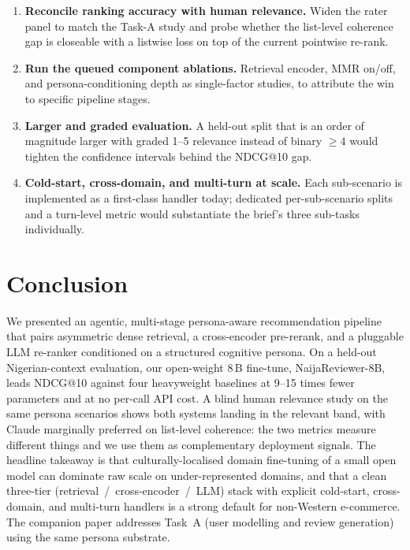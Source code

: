 \documentclass[sigconf,nonacm,balance]{acmart}
\begin{document}
\begin{enumerate}[leftmargin=*]
  \item \textbf{Reconcile ranking accuracy with human relevance.} Widen the
        rater panel to match the Task-A study and probe whether the
        list-level coherence gap is closeable with a listwise loss on top
        of the current pointwise re-rank.
  \item \textbf{Run the queued component ablations.} Retrieval encoder,
        MMR on/off, and persona-conditioning depth as single-factor studies,
        to attribute the win to specific pipeline stages.
  \item \textbf{Larger and graded evaluation.} A held-out split that is
        an order of magnitude larger with graded 1--5 relevance instead of
        binary $\geq 4$ would tighten the confidence intervals behind the
        NDCG@10 gap.
  \item \textbf{Cold-start, cross-domain, and multi-turn at scale.} Each
        sub-scenario is implemented as a first-class handler today;
        dedicated per-sub-scenario splits and a turn-level metric would
        substantiate the brief's three sub-tasks individually.
\end{enumerate}

\section{Conclusion}

We presented an agentic, multi-stage persona-aware recommendation pipeline
that pairs asymmetric dense retrieval, a cross-encoder pre-rerank, and a
pluggable LLM re-ranker conditioned on a structured cognitive persona. On a
held-out Nigerian-context evaluation, our open-weight 8\,B fine-tune,
NaijaReviewer-8B, leads NDCG@10 against four heavyweight baselines at 9--15
times fewer parameters and at no per-call API cost. A blind human relevance
study on the same persona scenarios shows both systems landing in the
relevant band, with Claude marginally preferred on list-level coherence:
the two metrics measure different things and we use them as complementary
deployment signals. The headline takeaway is that culturally-localised
domain fine-tuning of a small open model can dominate raw scale on
under-represented domains, and that a clean three-tier
(retrieval~/~cross-encoder~/~LLM) stack with explicit cold-start,
cross-domain, and multi-turn handlers is a strong default for non-Western
e-commerce. The companion paper addresses Task~A (user modelling and review
generation) using the same persona substrate.



\end{document}
